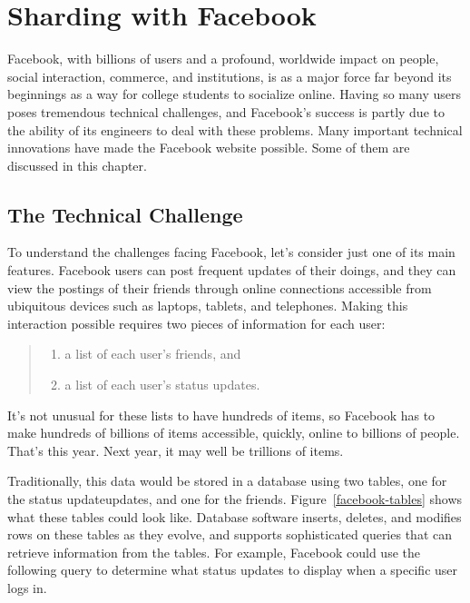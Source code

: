 \chapter{Sharding with Facebook}

Facebook,
with billions of users and a profound, worldwide impact
on people, social interaction, commerce, and institutions,
is as a major force far beyond its beginnings
as a way for college students to socialize online.
Having so many users poses tremendous technical challenges,
and Facebook's success is partly due to
the ability of its engineers to deal with these problems.
Many important technical innovations
have made the Facebook website possible.
Some of them are discussed in this chapter.

\section{The Technical Challenge}

To understand the challenges facing Facebook,
let's consider just one of its main features.
Facebook users can post frequent updates of their doings,
and they can view the postings of their friends through online connections
accessible from ubiquitous devices such as laptops, tablets, and telephones.
Making this interaction possible requires two pieces of information for each user:
\begin{quote}
\begin{enumerate}
	\item a list of each user's friends, and
	\item a list of each user's status updates.
\end{enumerate}
\end{quote}
It's not unusual for these lists to have hundreds of items,
so Facebook has to make hundreds of billions of items
accessible, quickly, online to billions of people.
That's this year. Next year, it may well be trillions of items.

Traditionally, this data would be stored in a database
using two tables, one for the status updateupdates,
and one for the friends.  Figure~\ref{facebook-tables}
shows what these tables could look like.
Database software inserts, deletes, and modifies
rows on these tables as they evolve,
and supports sophisticated queries that can
retrieve information from the tables.
For example, Facebook could use the following query to determine
what status updates to display when a specific user logs in.

